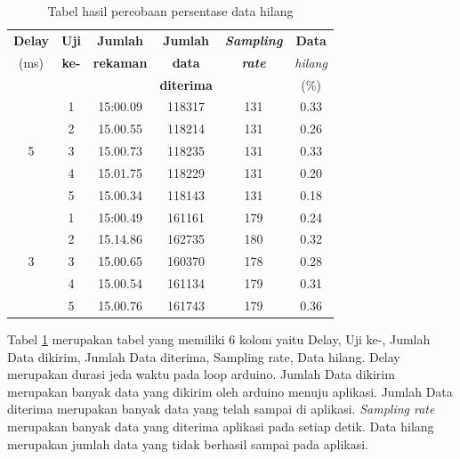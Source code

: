 \begin{table}[H]
	\caption{Tabel hasil percobaan persentase data hilang}
	\begin{tabular}{|c|c|c|c|c|c|}
		\hline
		\multicolumn{1}{|c|}{{\color[HTML]{000000} \textbf{Delay}}} & \multicolumn{1}{|c|}{\textbf{Uji}} &
		\multicolumn{1}{|c|}{ \textbf{Jumlah}} &
		\multicolumn{1}{|c|}{\textbf{Jumlah}} &
		\multicolumn{1}{|c|}{\textbf{\textit{Sampling}}}  & 
		\multicolumn{1}{|c|}{\textbf{Data}} \\
		(ms) &  \textbf{ke-}  & \textbf{rekaman}  & \textbf{data} & \textbf{\textit{rate}}  & \textit{hilang}\\
		&  &  &  \textbf{diterima} & & (\%) \\ \hline
		
		\multirow{5}{*}{5} &1& 15:00.09 &118317 &131 & 0.33 \\
		\cline{2-6}&2 &15.00.55 & 118214 &131 & 0.26\\ 
		\cline{2-6}&3 &15.00.73 & 118235 &131 & 0.33\\ 
		\cline{2-6}&4 &15.01.75 & 118229 &131 & 0.20\\ 
		\cline{2-6}&5 &15.00.34 & 118143 &131 & 0.18\\ 
		\hline
		\multirow{5}{*}{3} &1& 15:00.49 &161161 &179 & 0.24 \\
		\cline{2-6}&2 &15.14.86 & 162735 &180 & 0.32\\ 
		\cline{2-6}&3 &15.00.65 & 160370 &178 & 0.28\\ 
		\cline{2-6}&4 &15.00.54 & 161134 &179 & 0.31\\ 
		\cline{2-6}&5 &15.00.76 & 161743 &179 & 0.36\\ 
		\hline
		
	\end{tabular}
	\vspace{1ex}
	
	\label{tabel:4.1}
\end{table}
Tabel \ref{tabel:4.1} merupakan tabel yang memiliki 6 kolom yaitu Delay, Uji ke-, Jumlah Data dikirim, Jumlah Data diterima, Sampling
rate, Data hilang. Delay merupakan durasi jeda waktu pada loop
arduino. Jumlah Data dikirim merupakan banyak data yang dikirim
oleh arduino menuju aplikasi. Jumlah Data diterima merupakan banyak data yang telah sampai di aplikasi. \textit{Sampling rate} merupakan
banyak data yang diterima aplikasi pada setiap detik. Data hilang
merupakan jumlah data yang tidak berhasil sampai pada aplikasi.



